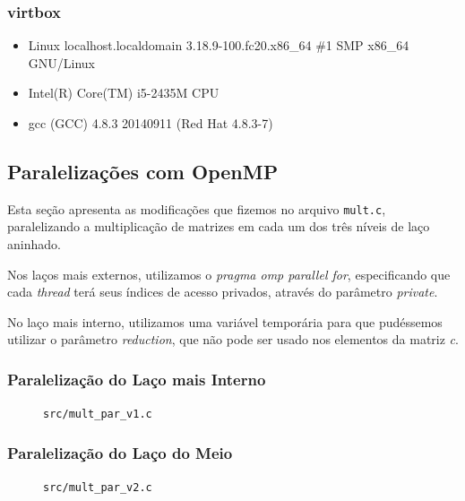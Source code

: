 \documentclass[a4paper, 12pt]{article}
\begin{document}
\subsubsection{virtbox}

\begin{itemize}
    \item Linux localhost.localdomain 3.18.9-100.fc20.x86\_64 \#1 SMP x86\_64
        GNU/Linux
    \item Intel(R) Core(TM) i5-2435M CPU
    \item gcc (GCC) 4.8.3 20140911 (Red Hat 4.8.3-7)
\end{itemize}

\subsection{Paralelizações com OpenMP} \label{sec:code}

Esta seção apresenta as modificações que fizemos no arquivo
\texttt{mult.c}, paralelizando a multiplicação de matrizes
em cada um dos três níveis de laço aninhado. 

Nos laços mais externos, utilizamos o \textit{pragma omp parallel for},
especificando que cada \textit{thread} terá seus índices de
acesso privados, através do parâmetro \textit{private}.

No laço mais interno, utilizamos uma variável temporária para que pudéssemos
utilizar o parâmetro \textit{reduction}, que não pode ser usado nos elementos
da matriz \textit{c}.

\subsubsection{Paralelização do Laço mais Interno}

\begin{figure}[H]
    \centering
    
    \caption{\texttt{src/mult\_par\_v1.c}}
    \label{fig:par_v1}
\end{figure}

\subsubsection{Paralelização do Laço do Meio}

\begin{figure}[H]
    \centering
    
    \caption{\texttt{src/mult\_par\_v2.c}}
    \label{fig:par_v2}
\end{figure}
\end{document}
